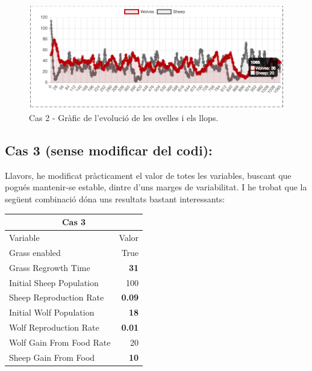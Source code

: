 \documentclass{article} %
\begin{document}
{	\begin{figure}[H]
		\begin{changemargin}{-1cm}{0.5cm}
			\includegraphics[width=14cm]{case_2_graph}
			\centering
			\color{blue}
			\caption{Cas 2 - Gràfic de l'evolució de les ovelles i els llops.}\label{visina8}
		\end{changemargin}
	\end{figure}

	\subsection*{Cas 3 (sense modificar del codi):}
	Llavors, he modificat pràcticament el valor de totes les variables, buscant que pogués mantenir-se estable, dintre d'uns marges de variabilitat. I he trobat que la següent combinació dóna uns resultats bastant interessants: \\

	{\selectfont\small
	\begin{tabular}{l | r}
		\multicolumn{2}{c}{Cas 3}  \\ \hline
		Variable & Valor \\ \hline
		Grass enabled & True \\
		Grass Regrowth Time & \textbf{31} \\
		Initial Sheep Population & 100 \\
		Sheep Reproduction Rate & \textbf{0.09} \\
		Initial Wolf Population & \textbf{18} \\
		Wolf Reproduction Rate & \textbf{0.01} \\
		Wolf Gain From Food Rate & 20 \\
		Sheep Gain From Food & \textbf{10}\\
	\end{tabular}
	} \\

}
\end{document}
